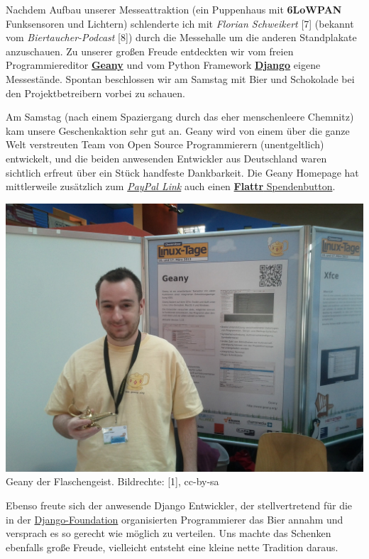 Nachdem Aufbau unserer Messeattraktion (ein Puppenhaus mit \textbf{6LoWPAN} Funksensoren und Lichtern) schlenderte ich mit \textit{Florian Schweikert} [7] (bekannt vom \textit{Biertaucher-Podcast} [8]) durch die Messehalle um die anderen Standplakate anzuschauen. Zu unserer großen Freude entdeckten wir vom freien Programmiereditor \href{http://geany.org/}{\textbf{Geany}} und vom Python Framework \href{https://www.djangoproject.com/}{\textbf{Django}} eigene Messestände. Spontan beschlossen wir am Samstag mit Bier und Schokolade bei den Projektbetreibern vorbei zu schauen.

Am Samstag (nach einem Spaziergang durch das eher menschenleere Chemnitz) kam unsere Geschenkaktion sehr gut an. Geany wird von einem über die ganze Welt verstreuten Team von  Open Source Programmierern (unentgeltlich) entwickelt, und die beiden anwesenden Entwickler aus Deutschland waren sichtlich erfreut über ein Stück handfeste Dankbarkeit. Die Geany Homepage hat mittlerweile zusätzlich zum \href{https://www.paypal.com/cgi-bin/webscr?cmd=_s-xclick&hosted_button_id=8049199&lc=GB}{\textit{PayPal Link}} auch einen  \href{http://flattr.com/thing/1151425/Geany}{\textbf{Flattr} Spendenbutton}. 

\begin{center}
\includegraphics[width=\linewidth]{chemnitz/chemnitz_geany2.jpg}
\footnotesize{Geany der Flaschengeist. Bildrechte: [1], cc-by-sa}
\end{center}

Ebenso freute sich der anwesende Django Entwickler, der stellvertretend für die in der \href{https://www.djangoproject.com/foundation/}{Django-Foundation} organisierten  Programmierer das Bier annahm und versprach es so gerecht wie möglich zu verteilen. Uns machte das Schenken ebenfalls große Freude, vielleicht entsteht eine kleine nette Tradition daraus.

